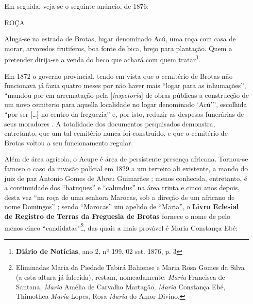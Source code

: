 Em seguida, veja-se o seguinte anúncio, de 1876:

\begin{citacao}
ROÇA

Aluga-se na estrada de Brotas, lugar denominado Acú, uma roça com casa de morar, arvoredos frutiferos, boa fonte de bica, brejo para plantação. Quem a pretender dirija-se a venda do beco que achará com quem tratar\footnote{\textbf{Diário de Notícias}, ano 2, nº 199, 02 set. 1876, p. 3}.
\end{citacao}

Em 1872 o governo provincial, tendo em vista que o cemitério de Brotas não funcionava já fazia quatro meses por não haver mais ``logar para as inhumações'', ``mandou por em arrematação pela [\textit{inspetoria}] de obras públicas a construcção de um novo cemiterio para aquella localidade no logar denominado `Acú''', escolhida ``por ser [\dots] no centro da freguezia'' e, por isto, reduzir as despesas funerárias de seus moradores \cite[p.~12]{bahia_1872}. A totalidade dos documentos pesquisados demonstra, entretanto, que um tal cemitério nunca foi construído, e que o cemitério de Brotas voltou a seu funcionamento regular.

Além de área agrícola, o Acupe é área de persistente presença africana. Tornou-se famoso o caso da invasão polícial em 1829 a um terreiro ali existente, a mando do juiz de paz Antonio Gomes de Abreu Guimarães \cite[pp.~32-61]{REISSILVA1989}; menos conhecida, entretanto, é a continuidade dos ``batuques'' e ``calundus'' na área trinta e cinco anos depois, desta vez ``na roça de uma senhora Marocas, sob a direção de um africano de nome Domingos'' \cite[p.~137]{reis_domingos_2008}; sendo ``Marocas'' um apelido de ``Maria'', o \textbf{Livro Eclesial de Registro de Terras da Freguesia de Brotas} fornece o nome de pelo menos cinco ``candidatas''\footnote{Eliminadas Maria da Piedade Tabirá Bahiense e Maria Rosa Gomes da Silva (a esta altura já falecida), restam, nomeadamente: \textit{Maria} Francisca de Santana, \textit{Maria} Amélia de Carvalho Martagão, \textit{Maria} Constança Ebé, Thimothea \textit{Maria} Lopes, Rosa \textit{Maria} do Amor Divino.}, das quais a mais provável é Maria Constança Ebé:

